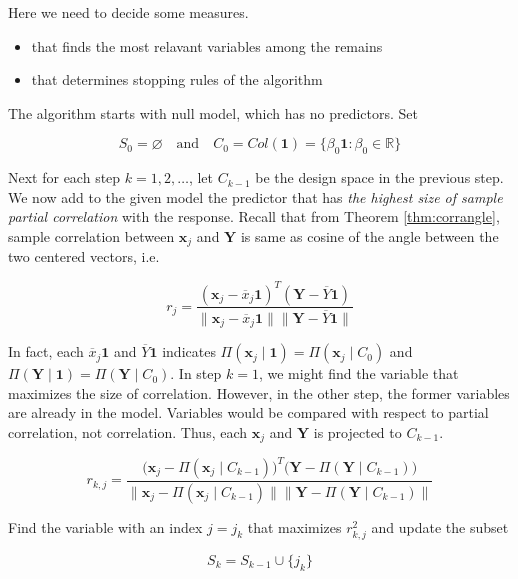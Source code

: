 \documentclass[]{book}
\providecommand{\tightlist}{%
  \setlength{\itemsep}{0pt}\setlength{\parskip}{0pt}}
\theoremstyle{definition}
\theoremstyle{definition}
\theoremstyle{definition}
\theoremstyle{remark}
\begin{document}
Here we need to decide some measures.

\begin{itemize}
\tightlist
\item
  that finds the most relavant variables among the remains
\item
  that determines stopping rules of the algorithm
\end{itemize}

The algorithm starts with null model, which has no predictors. Set

\[S_0 = \varnothing \quad \text{and} \quad C_0 = Col(\mathbf{1}) = \{ \beta_0 \mathbf{1} : \beta_0 \in \mathbb{R}\}\]

Next for each step \(k = 1, 2, \ldots\), let \(C_{k - 1}\) be the design space in the previous step. We now add to the given model the predictor that has \emph{the highest size of sample partial correlation} with the response. Recall that from Theorem \ref{thm:corrangle}, sample correlation between \(\mathbf{x}_j\) and \(\mathbf{Y}\) is same as cosine of the angle between the two centered vectors, i.e.

\[r_j = \frac{(\mathbf{x}_j - \overline{x}_j \mathbf{1})^T (\mathbf{Y} - \overline{Y} \mathbf{1})}{\lVert \mathbf{x}_j - \overline{x}_j \mathbf{1} \rVert \lVert \mathbf{Y} - \overline{Y} \mathbf{1} \rVert}\]

In fact, each \(\overline{x}_j \mathbf{1}\) and \(\overline{Y} \mathbf{1}\) indicates \(\Pi(\mathbf{x}_j \mid \mathbf{1}) = \Pi(\mathbf{x}_j \mid C_0)\) and \(\Pi(\mathbf{Y} \mid \mathbf{1}) = \Pi(\mathbf{Y} \mid C_0)\). In step \(k = 1\), we might find the variable that maximizes the size of correlation. However, in the other step, the former variables are already in the model. Variables would be compared with respect to partial correlation, not correlation. Thus, each \(\mathbf{x}_j\) and \(\mathbf{Y}\) is projected to \(C_{k - 1}\).

\begin{equation}
  r_{k, j} = \frac{\Big(\mathbf{x}_j - \Pi(\mathbf{x}_j \mid C_{k - 1})\Big)^T \Big(\mathbf{Y} - \Pi(\mathbf{Y} \mid C_{k - 1})\Big)}{\lVert \mathbf{x}_j - \Pi(\mathbf{x}_j \mid C_{k - 1}) \rVert \lVert \mathbf{Y} - \Pi(\mathbf{Y} \mid C_{k - 1}) \rVert}
  \label{eq:parcor}
\end{equation}

Find the variable with an index \(j = j_k\) that maximizes \(r_{k, j}^2\) and update the subset

\[S_k = S_{k - 1} \cup \{ j_k \}\]
\end{document}
